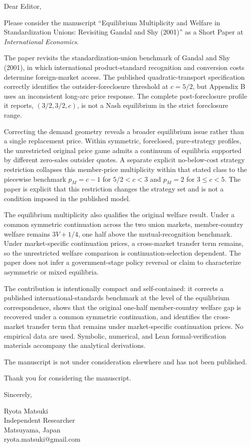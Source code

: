 \documentclass[11pt]{article}
\begin{document}
Dear Editor,

Please consider the manuscript ``Equilibrium Multiplicity and Welfare in Standardization Unions: Revisiting Gandal and Shy (2001)'' as a Short Paper at \textit{International Economics}.

The paper revisits the standardization-union benchmark of Gandal and Shy (2001), in which international product-standard recognition and conversion costs determine foreign-market access. The published quadratic-transport specification correctly identifies the outsider-foreclosure threshold at $c=5/2$, but Appendix B uses an inconsistent long-arc price response. The complete post-foreclosure profile it reports, $(3/2,3/2,c)$, is not a Nash equilibrium in the strict foreclosure range.

Correcting the demand geometry reveals a broader equilibrium issue rather than a single replacement price. Within symmetric, foreclosed, pure-strategy profiles, the unrestricted original price game admits a continuum of equilibria supported by different zero-sales outsider quotes. A separate explicit no-below-cost strategy restriction collapses this member-price multiplicity within that stated class to the piecewise benchmark $p_M=c-1$ for $5/2<c<3$ and $p_M=2$ for $3\leq c<5$. The paper is explicit that this restriction changes the strategy set and is not a condition imposed in the published model.

The equilibrium multiplicity also qualifies the original welfare result. Under a common symmetric continuation across the two union markets, member-country welfare remains $3V+1/4$, one half above the mutual-recognition benchmark. Under market-specific continuation prices, a cross-market transfer term remains, so the unrestricted welfare comparison is continuation-selection dependent. The paper does not infer a government-stage policy reversal or claim to characterize asymmetric or mixed equilibria.

The contribution is intentionally compact and self-contained: it corrects a published international-standards benchmark at the level of the equilibrium correspondence, shows that the original one-half member-country welfare gap is recovered under a common symmetric continuation, and identifies the cross-market transfer term that remains under market-specific continuation prices. No empirical data are used. Symbolic, numerical, and Lean formal-verification materials accompany the analytical derivations.

The manuscript is not under consideration elsewhere and has not been published.

Thank you for considering the manuscript.

Sincerely,

Ryota Matsuki\\
Independent Researcher\\
Matsuyama, Japan\\
ryota.matsuki@gmail.com
\end{document}
